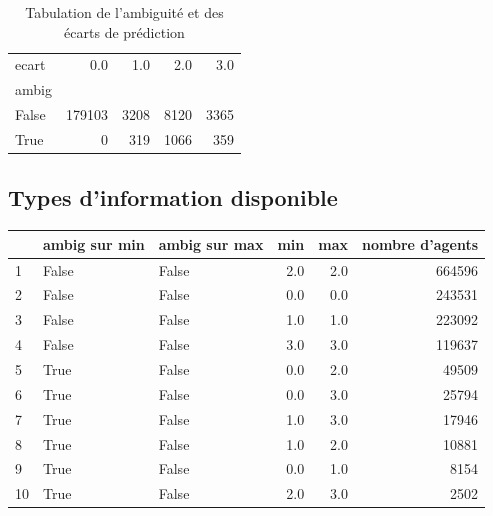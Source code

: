 \documentclass[11pt,a4paper]{article}
\begin{document}
\begin{table}
	\caption{Tabulation de l'ambiguité et des écarts de prédiction}
\begin{tabular}{lrrrr}
	\toprule
	ecart &     0.0 &   1.0 &   2.0 &   3.0 \\
	ambig &         &       &       &       \\
	\midrule
	False                    &  179103 &  3208 &  8120 &  3365 \\
	True                     &       0 &   319 &  1066 &   359 \\
	\bottomrule
\end{tabular}
\end{table}

\pagebreak
\subsection{Types d'information disponible}


\begin{tabular}{lllrrr}
	\toprule
	{} & ambig sur min & ambig sur max &  min &  max &   nombre d'agents \\
	\midrule
	1 &           False &           False &                           2.0 &                           2.0 &  664596 \\
	2 &           False &           False &                           0.0 &                           0.0 &  243531 \\
	3 &           False &           False &                           1.0 &                           1.0 &  223092 \\
	4 &           False &           False &                           3.0 &                           3.0 &  119637 \\
	5 &            True &           False &                           0.0 &                           2.0 &   49509 \\
	6 &            True &           False &                           0.0 &                           3.0 &   25794 \\
	7 &            True &           False &                           1.0 &                           3.0 &   17946 \\
	8 &            True &           False &                           1.0 &                           2.0 &   10881 \\
	9 &            True &           False &                           0.0 &                           1.0 &    8154 \\
	10 &            True &           False &                           2.0 &                           3.0 &    2502 \\
	\bottomrule
\end{tabular}
\end{document}
